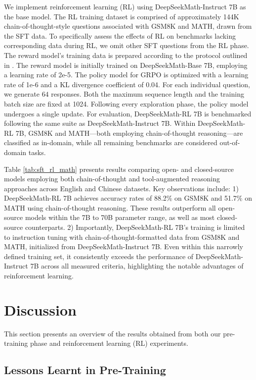 \begin{itemize}[topsep=0pt]
\begin{itemize}[topsep=0pt]
We implement reinforcement learning (RL) using DeepSeekMath-Instruct 7B as the base model. The RL training dataset is comprised of approximately 144K chain-of-thought-style questions associated with GSM8K and MATH, drawn from the SFT data. To specifically assess the effects of RL on benchmarks lacking corresponding data during RL, we omit other SFT questions from the RL phase. The reward model’s training data is prepared according to the protocol outlined in \citep{wang2023math}. The reward model is initially trained on DeepSeekMath-Base 7B, employing a learning rate of 2e-5. The policy model for GRPO is optimized with a learning rate of 1e-6 and a KL divergence coefficient of 0.04. For each individual question, we generate $64$ responses. Both the maximum sequence length and the training batch size are fixed at 1024. Following every exploration phase, the policy model undergoes a single update. For evaluation, DeepSeekMath-RL 7B is benchmarked following the same suite as DeepSeekMath-Instruct 7B. Within DeepSeekMath-RL 7B, GSM8K and MATH—both employing chain-of-thought reasoning—are classified as in-domain, while all remaining benchmarks are considered out-of-domain tasks.

Table \ref{tab:sft_rl_math} presents results comparing open- and closed-source models employing both chain-of-thought and tool-augmented reasoning approaches across English and Chinese datasets. Key observations include: 1) DeepSeekMath-RL 7B achieves accuracy rates of 88.2\% on GSM8K and 51.7\% on MATH using chain-of-thought reasoning. These results outperform all open-source models within the 7B to 70B parameter range, as well as most closed-source counterparts. 2) Importantly, DeepSeekMath-RL 7B’s training is limited to instruction tuning with chain-of-thought-formatted data from GSM8K and MATH, initialized from DeepSeekMath-Instruct 7B. Even within this narrowly defined training set, it consistently exceeds the performance of DeepSeekMath-Instruct 7B across all measured criteria, highlighting the notable advantages of reinforcement learning.

\section{Discussion}
This section presents an overview of the results obtained from both our pre-training phase and reinforcement learning (RL) experiments.

\subsection{Lessons Learnt in Pre-Training}


\end{itemize}
\end{itemize}
